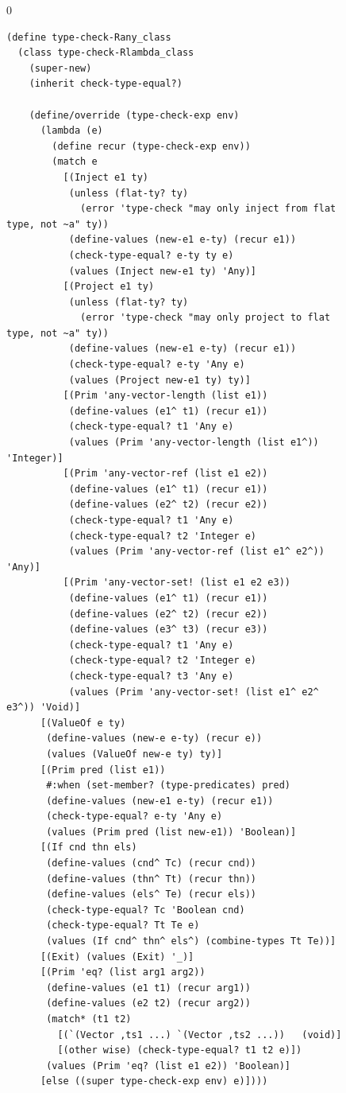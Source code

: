 \documentclass[7x10,nocrop]{TimesAPriori_MIT}%
\def\racketEd{0}
\def\edition{0}
\begin{document}
\begin{figure}[btp]
{\if\edition\racketEd
\begin{lstlisting}[basicstyle=\ttfamily\small]
(define type-check-Rany_class
  (class type-check-Rlambda_class
    (super-new)
    (inherit check-type-equal?)

    (define/override (type-check-exp env)
      (lambda (e)
        (define recur (type-check-exp env))
        (match e
          [(Inject e1 ty)
           (unless (flat-ty? ty)
             (error 'type-check "may only inject from flat type, not ~a" ty))
           (define-values (new-e1 e-ty) (recur e1))
           (check-type-equal? e-ty ty e)
           (values (Inject new-e1 ty) 'Any)]
          [(Project e1 ty)
           (unless (flat-ty? ty)
             (error 'type-check "may only project to flat type, not ~a" ty))
           (define-values (new-e1 e-ty) (recur e1))
           (check-type-equal? e-ty 'Any e)
           (values (Project new-e1 ty) ty)]
          [(Prim 'any-vector-length (list e1))
           (define-values (e1^ t1) (recur e1))
           (check-type-equal? t1 'Any e)
           (values (Prim 'any-vector-length (list e1^)) 'Integer)]
          [(Prim 'any-vector-ref (list e1 e2))
           (define-values (e1^ t1) (recur e1))
           (define-values (e2^ t2) (recur e2))
           (check-type-equal? t1 'Any e)
           (check-type-equal? t2 'Integer e)
           (values (Prim 'any-vector-ref (list e1^ e2^)) 'Any)]
          [(Prim 'any-vector-set! (list e1 e2 e3))
           (define-values (e1^ t1) (recur e1))
           (define-values (e2^ t2) (recur e2))
           (define-values (e3^ t3) (recur e3))
           (check-type-equal? t1 'Any e)
           (check-type-equal? t2 'Integer e)
           (check-type-equal? t3 'Any e)
           (values (Prim 'any-vector-set! (list e1^ e2^ e3^)) 'Void)]
      [(ValueOf e ty)
       (define-values (new-e e-ty) (recur e))
       (values (ValueOf new-e ty) ty)]
      [(Prim pred (list e1))
       #:when (set-member? (type-predicates) pred)
       (define-values (new-e1 e-ty) (recur e1))
       (check-type-equal? e-ty 'Any e)
       (values (Prim pred (list new-e1)) 'Boolean)]
      [(If cnd thn els)
       (define-values (cnd^ Tc) (recur cnd))
       (define-values (thn^ Tt) (recur thn))
       (define-values (els^ Te) (recur els))
       (check-type-equal? Tc 'Boolean cnd)
       (check-type-equal? Tt Te e)
       (values (If cnd^ thn^ els^) (combine-types Tt Te))]
      [(Exit) (values (Exit) '_)]
      [(Prim 'eq? (list arg1 arg2))
       (define-values (e1 t1) (recur arg1))
       (define-values (e2 t2) (recur arg2))
       (match* (t1 t2)
         [(`(Vector ,ts1 ...) `(Vector ,ts2 ...))   (void)]
         [(other wise) (check-type-equal? t1 t2 e)])
       (values (Prim 'eq? (list e1 e2)) 'Boolean)]
      [else ((super type-check-exp env) e)])))


\end{lstlisting}}
\end{figure}
\end{document}
